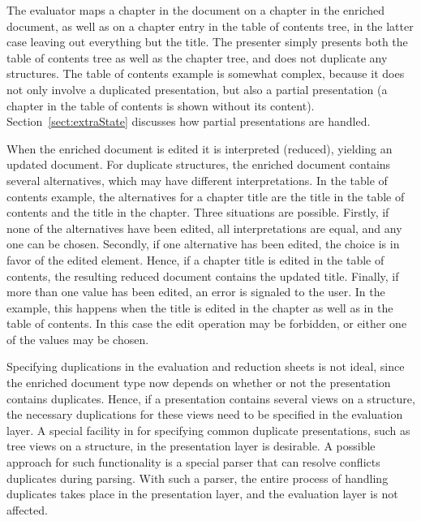 The evaluator maps a chapter in the document on a chapter in the enriched document, as well as on a chapter entry in the table of contents tree, in the latter case leaving out everything but the title. The presenter simply presents both the table of contents tree as well as the chapter tree, and does not duplicate any structures. The table of contents example is somewhat complex, because it does not only involve a duplicated presentation, but also a partial presentation (a chapter in the table of contents is shown without its content). Section~\ref{sect:extraState} discusses how partial presentations are handled.

When the enriched document is edited it is interpreted (reduced), yielding an updated document. For duplicate structures, the enriched document contains several alternatives, which may have different interpretations. In the table of contents example, the alternatives for a chapter title are the title in the table of contents and the title in the chapter. Three situations are possible. Firstly, if none of the alternatives have been edited, all interpretations are equal, and any one can be chosen. Secondly, if one alternative has been edited, the choice is in favor of the edited element. Hence, if a chapter title is edited in the table of contents, the resulting reduced document contains the updated title. Finally, if more than one value has been edited, an error is signaled to the user. In the example, this happens when the title is edited in the chapter as well as in the table of contents. In this case the edit operation may be forbidden, or either one of the values may be chosen.  

Specifying duplications in the evaluation and reduction sheets is not ideal, since the enriched document type now depends on whether or not the presentation contains duplicates. Hence, if a presentation contains several views on a structure, the necessary duplications for these views need to be specified in the evaluation layer. A special facility in for specifying common duplicate presentations, such as tree views on a structure, in the presentation layer is desirable. A possible approach for such functionality is a special parser that can resolve conflicts duplicates during parsing. With such a parser, the entire process of handling duplicates takes place in the presentation layer, and the evaluation layer is not affected. 

